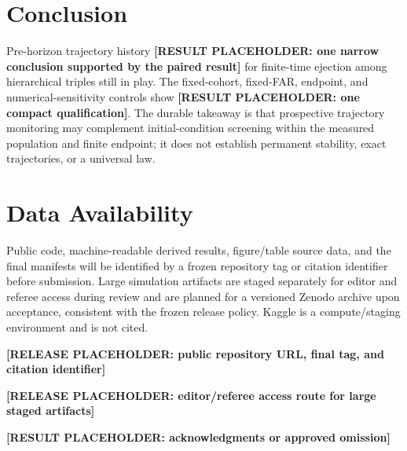 \documentclass[linenumbers,twocolumn]{aastex702}
\newcommand{\resultplaceholder}[1]{\textbf{[RESULT PLACEHOLDER: #1]}}
\newcommand{\releaseplaceholder}[1]{\textbf{[RELEASE PLACEHOLDER: #1]}}
\begin{document}
\section{Conclusion}\label{sec:conclusion}
Pre-horizon trajectory history \resultplaceholder{one narrow conclusion supported by the paired result} for finite-time ejection among hierarchical triples still in play. The fixed-cohort, fixed-FAR, endpoint, and numerical-sensitivity controls show \resultplaceholder{one compact qualification}. The durable takeaway is that prospective trajectory monitoring may complement initial-condition screening within the measured population and finite endpoint; it does not establish permanent stability, exact trajectories, or a universal law.

\section*{Data Availability}
Public code, machine-readable derived results, figure/table source data, and the final manifests will be identified by a frozen repository tag or citation identifier before submission. Large simulation artifacts are staged separately for editor and referee access during review and are planned for a versioned Zenodo archive upon acceptance, consistent with the frozen release policy. Kaggle is a compute/staging environment and is not cited.

\releaseplaceholder{public repository URL, final tag, and citation identifier}

\releaseplaceholder{editor/referee access route for large staged artifacts}

\begin{acknowledgments}
\resultplaceholder{acknowledgments or approved omission}
\end{acknowledgments}


{}

\end{document}
